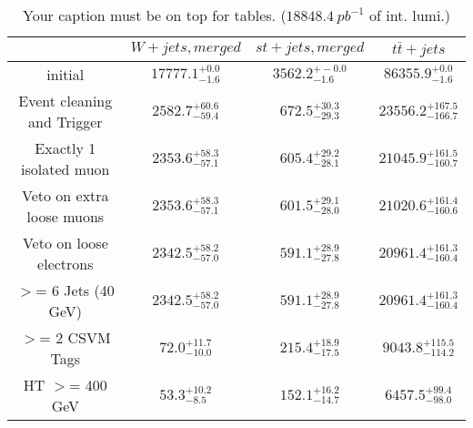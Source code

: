 \documentclass{article}
\begin{document}
\begin{table}
\caption{Your caption must be on top for tables. ($18848.4~pb^{-1}$ of int. lumi.)}
\label{tab:}
\centering
\begin{tabular}{|c|ccc|}
\toprule
&$W+jets, merged$	&$st+jets, merged$	&$t\bar{t}+jets$	\\

\midrule
initial&	$17777.1^{+0.0}_{-1.6}$	&$3562.2^{+-0.0}_{-1.6}$	&$86355.9^{+0.0}_{-1.6}$	\\

Event cleaning and Trigger&	$2582.7^{+60.6}_{-59.4}$	&$672.5^{+30.3}_{-29.3}$	&$23556.2^{+167.5}_{-166.7}$	\\

Exactly 1 isolated muon&	$2353.6^{+58.3}_{-57.1}$	&$605.4^{+29.2}_{-28.1}$	&$21045.9^{+161.5}_{-160.7}$	\\

Veto on extra loose muons&	$2353.6^{+58.3}_{-57.1}$	&$601.5^{+29.1}_{-28.0}$	&$21020.6^{+161.4}_{-160.6}$	\\

Veto on loose electrons&	$2342.5^{+58.2}_{-57.0}$	&$591.1^{+28.9}_{-27.8}$	&$20961.4^{+161.3}_{-160.4}$	\\

$>$= 6 Jets (40 GeV)&	$2342.5^{+58.2}_{-57.0}$	&$591.1^{+28.9}_{-27.8}$	&$20961.4^{+161.3}_{-160.4}$	\\

$>$= 2 CSVM Tags&	$72.0^{+11.7}_{-10.0}$	&$215.4^{+18.9}_{-17.5}$	&$9043.8^{+115.5}_{-114.2}$	\\

HT $>$=  400 GeV&	$53.3^{+10.2}_{-8.5}$	&$152.1^{+16.2}_{-14.7}$	&$6457.5^{+99.4}_{-98.0}$	\\

\bottomrule
\end{tabular}
\end{table}
\end{document}
